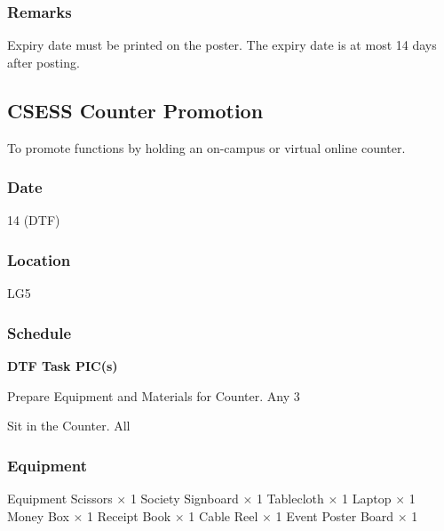 \subsubsection{Remarks}
Expiry date must be printed on the poster. The expiry date is at most 14 days after posting.

\subsection{CSESS Counter Promotion}
To promote functions by holding an on-campus or virtual online counter.

\subsubsection{Date}
14 (DTF)

\subsubsection{Location}
LG5

\subsubsection{Schedule}

\setupTABLE[c][1][width=1.25in]
\setupTABLE[c][2][width=3.5in]
\setupTABLE[c][3][width=1.25in]
\bTABLE
\bTABLEhead

\bTR\bTH    \bf{DTF}
\eTH\bTH    \bf{Task}
\eTH\bTH    \bf{PIC(s)}
\eTH\eTR

\eTABLEhead
\bTABLEbody

\bTR{}
\eTD\bTD Prepare Equipment and Materials for Counter.
\eTD\bTD Any 3
\eTD\eTR

\bTR{}
\eTD\bTD Sit in the Counter.
\eTD\bTD All
\eTD\eTR

\eTABLEbody
\eTABLE

\subsubsection{Equipment}
\starttabulate[|l|l|]
\NC{}Equipment\NC\NR
\HL
\NC Scissors            \NC $\times$ 1  \NR
\NC Society Signboard   \NC $\times$ 1  \NR
\NC Tablecloth          \NC $\times$ 1  \NR
\NC Laptop              \NC $\times$ 1  \NR
\NC Money Box           \NC $\times$ 1  \NR
\NC Receipt Book        \NC $\times$ 1  \NR
\NC Cable Reel          \NC $\times$ 1  \NR
\NC Event Poster Board  \NC $\times$ 1  \NR
\HL
\stoptabulate

\pagebreak
